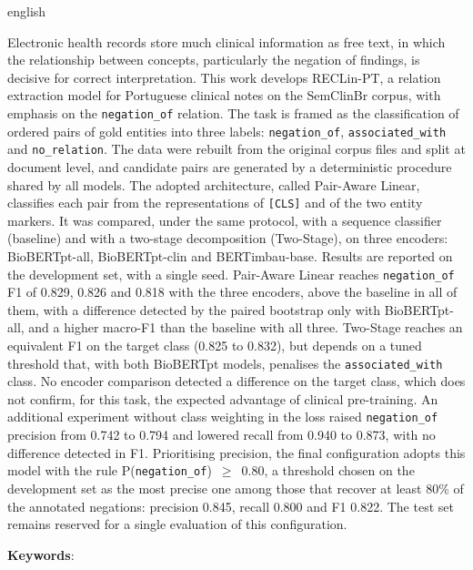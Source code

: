 \begin{resumo}[Abstract]
  \vspace{-15pt}

  \begin{otherlanguage*}{english}

  Electronic health records store much clinical information as free text, in which
  the relationship between concepts, particularly the negation of findings, is
  decisive for correct interpretation. This work develops RECLin-PT, a relation
  extraction model for Portuguese clinical notes on the SemClinBr corpus, with
  emphasis on the \texttt{negation\_of} relation. The task is framed as the
  classification of ordered pairs of gold entities into three labels:
  \texttt{negation\_of}, \texttt{associated\_with} and \texttt{no\_relation}. The
  data were rebuilt from the original corpus files and split at document level, and
  candidate pairs are generated by a deterministic procedure shared by all models.
  The adopted architecture, called Pair-Aware Linear, classifies each pair from the
  representations of \texttt{[CLS]} and of the two entity markers. It was compared,
  under the same protocol, with a sequence classifier (baseline) and with a
  two-stage decomposition (Two-Stage), on three encoders: BioBERTpt-all,
  BioBERTpt-clin and BERTimbau-base. Results are reported on the development set,
  with a single seed. Pair-Aware Linear reaches \texttt{negation\_of} F1 of 0.829,
  0.826 and 0.818 with the three encoders, above the baseline in all of them, with a
  difference detected by the paired bootstrap only with BioBERTpt-all, and a higher
  macro-F1 than the baseline with all three. Two-Stage reaches an equivalent F1 on
  the target class (0.825 to 0.832), but depends on a tuned threshold that, with
  both BioBERTpt models, penalises the \texttt{associated\_with} class. No encoder
  comparison detected a difference on the target class, which does not confirm, for
  this task, the expected advantage of clinical pre-training. An additional
  experiment without class weighting in the loss raised \texttt{negation\_of}
  precision from 0.742 to 0.794 and lowered recall from 0.940 to 0.873, with no
  difference detected in F1. Prioritising precision, the final configuration adopts
  this model with the rule P(\texttt{negation\_of})~$\geq$~0.80, a threshold chosen
  on the development set as the most precise one among those that recover at least
  80\% of the annotated negations:
  precision 0.845, recall 0.800 and F1 0.822. The test set remains reserved for a
  single evaluation of this configuration.

  \vspace{\onelineskip}

  \noindent\textbf{Keywords}: \inlinekeywords
\end{otherlanguage*}
\end{resumo}
